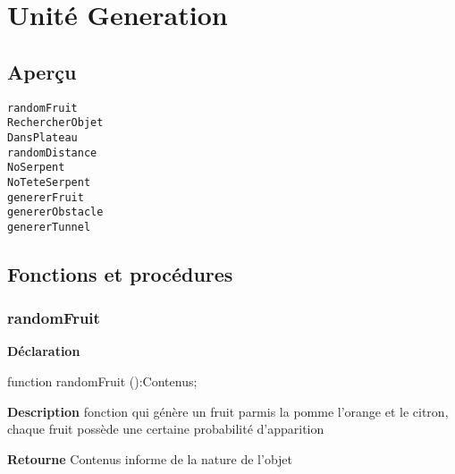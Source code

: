 \documentclass{report}
\newif\ifpdf
\begin{document}
\chapter{Unité Generation}
\label{Generation}
\section{Aperçu}
\begin{description}
\item[\texttt{randomFruit}]
\item[\texttt{RechercherObjet}]
\item[\texttt{DansPlateau}]
\item[\texttt{randomDistance}]
\item[\texttt{NoSerpent}]
\item[\texttt{NoTeteSerpent}]
\item[\texttt{genererFruit}]
\item[\texttt{genererObstacle}]
\item[\texttt{genererTunnel}]
\end{description}
\section{Fonctions et procédures}
\ifpdf
\subsection*{\large{\textbf{randomFruit}}\normalsize\hspace{1ex}\hrulefill}
\else
\subsection*{randomFruit}
\fi
\label{Generation-randomFruit}
\begin{list}{}{
\setlength{\itemindent}{0cm}
\setlength{\listparindent}{0cm}
\setlength{\leftmargin}{\evensidemargin}
\addtolength{\leftmargin}{\tmplength}
\settowidth{\labelsep}{X}
\addtolength{\leftmargin}{\labelsep}
\setlength{\labelwidth}{\tmplength}
}
\item[\textbf{Déclaration}\hfill]
\ifpdf
\begin{flushleft}
\fi
\begin{ttfamily}
function randomFruit ():Contenus;\end{ttfamily}

\ifpdf
\end{flushleft}
\fi

\par
\item[\textbf{Description}]
fonction qui génère un fruit parmis la pomme l'orange et le citron, chaque fruit possède une certaine probabilité d'apparition \par
\item[\textbf{Retourne}]Contenus informe de la nature de l'objet


\end{list}
\ifpdf
\end{document}
